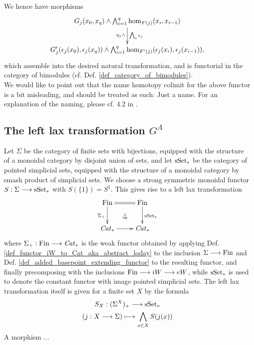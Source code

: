 \begin{defn}
      We hence have morphisms
      \begin{displaymath}
        \xymatrix{
          G_j(x_0,x_q) \wedge \bigwedge_{i=1}^q \hom_{F(j)}(x_i,x_{i-1}) %
            \ar[d]_{\eta_j \wedge}^{\bigwedge_i \epsilon_j}
          \\
          G_j^\prime(\epsilon_j(x_0),\epsilon_j(x_q)) \wedge %
            \bigwedge_{i=1}^q \hom_{F^\prime(j)}(\epsilon_j(x_i),\epsilon_j(x_{i-1})),  
        }
      \end{displaymath}
      which assemble into the desired natural transformation, and is functorial in the category of bimodules (cf. Def. \ref{def_category_of_bimodules}).\\
      We would like to point out that the name homotopy colimit for the above functor is a bit misleading, and should be treated as such: Just a name. 
      For an explanation of the naming, please cf. 4.2 in \cite{brun2010covering}.
    \end{defn}

  \subsection{The left lax transformation $G^A$}

    \begin{defn}\label{def_left_lax_transformation_S}
      Let $\Sigma$ be the category of finite sets with bijections, equipped with the structure of a monoidal category by disjoint union of sets, and let $\mathrm{sSet}_*$ be the category of pointed simplicial sets, equipped with the structure of a monoidal category by smash product of simplicial sets.
      We choose a strong symmetric monoidal functor $S: \Sigma \longrightarrow \mathrm{sSet}_*$ with $S(\{1\}) = S^1$.
      This gives rise to a left lax transformation
      \begin{displaymath}
        \xymatrix{
          \Fin 
            \ar@{=}[r] 
            \ar[d]_{\Sigma_+} 
            \ar@{}[rd]|{\overset{S}{\Rightarrow}} 
          & 
          \Fin \ar[d]^{\sS_*} \\
          \Cat_* \ar[r] & \Cat_*
        }
      \end{displaymath}
    where $\Sigma_+: \mathrm{Fin} \longrightarrow \mathit{Cat}_*$ is the weak functor obtained by applying Def. \ref{def_functor_iW_to_Cat_aka_abstract_loday} to the inclusion $\Sigma \longrightarrow \mathrm{Fin}$ and Def. \ref{def_added_basepoint_extending_functor} to the resulting functor, and finally precomposing with the inclusions $\mathrm{Fin} \longrightarrow iW \longrightarrow eW$, while $\mathrm{sSet}_*$ is used to denote the constant functor with image pointed simplicial sets. The left lax transformation itself is given for a finite set $X$ by the formula
      \begin{gather*}
        S_X: (\Sigma^X)_+ \longrightarrow \mathrm{sSet}_* \\
        (j: X \longrightarrow \Sigma) \longmapsto \bigwedge_{x \in X} S(j(x))
      \end{gather*}
    A morphism ...
    \end{defn}

